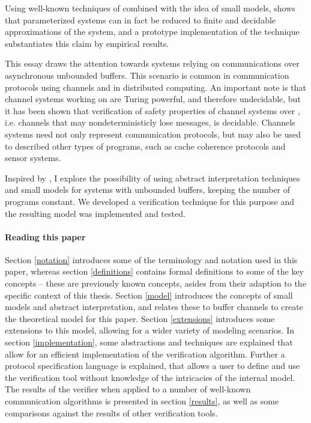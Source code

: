 Using well-known techniques of  combined with the idea of small models, \cite{parosh} shows that parameterized systems can in fact be reduced to finite and decidable approximations of the system, and a prototype implementation of the technique substantiates this claim by empirical results.

This essay draws the attention towards systems relying on communications over asynchronous unbounded buffers. This scenario is common in communication protocols using channels and in distributed computing. An important note is that channel systems working on  are Turing powerful, and therefore undecidable, but it has been shown that verification of safety properties of channel systems over , i.e. channels that may nondeterministicly lose messages, is decidable\cite{287591}\cite{gordon}. Channels systems need not only represent communication protocols, but may also be used to described other types of programs, such as cache coherence protocols and sensor systems\cite{zuck2004}.

Inspired by \cite{parosh}, I explore the possibility of using abstract interpretation techniques and small models for systems with unbounded buffers, keeping the number of programs constant. We developed a verification technique for this purpose and the resulting model was implemented and tested. 



\paragraph{Reading this paper} Section \ref{notation} introduces some of the terminology and notation used in this paper, whereas section \ref{definitions} contains formal definitions to some of the key concepts -- these are previously known concepts, asides from their adaption to the specific context of this thesis. Section \ref{model} introduces the concepts of small models and abstract interpretation, and relates these to buffer channels to create the theoretical model for this paper. Section \ref{extensions} introduces some extensions to this model, allowing for a wider variety of modeling scenarios. In section \ref{implementation}, some abstractions and techniques are explained that allow for an efficient implementation of the verification algorithm. Further a protocol specification language is explained, that allows a user to define and use the verification tool without knowledge of the intricacies of the internal model. The results of the verifier when applied to a number of well-known communication algorithms is presented in section \ref{results}, as well as some comparisons against the results of other verification tools.

 	

